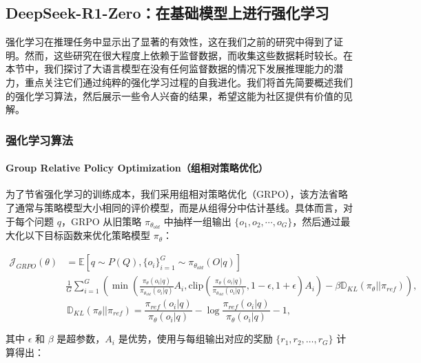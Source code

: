 \documentclass[lang=cn,a4paper,newtx]{elegantpaper}
\newcommand{\dsro}{DeepSeek-R1-Zero}
\begin{document}
\subsection{\dsro{}：在基础模型上进行强化学习}

强化学习在推理任务中显示出了显著的有效性，这在我们之前的研究中得到了证明。然而，这些研究在很大程度上依赖于监督数据，而收集这些数据耗时较长。在本节中，我们探讨了大语言模型在没有任何监督数据的情况下发展推理能力的潜力，重点关注它们通过纯粹的强化学习过程的自我进化。我们将首先简要概述我们的强化学习算法，然后展示一些令人兴奋的结果，希望这能为社区提供有价值的见解。

\subsubsection{强化学习算法}

\paragraph{Group Relative Policy Optimization（组相对策略优化）} 为了节省强化学习的训练成本，我们采用组相对策略优化（GRPO），该方法省略了通常与策略模型大小相同的评价模型，而是从组得分中估计基线。具体而言，对于每个问题 $q$，GRPO 从旧策略 $\pi_{\theta_{old}}$ 中抽样一组输出 $\{o_1, o_2, \cdots, o_G\}$，然后通过最大化以下目标函数来优化策略模型 $\pi_{\theta}$：

\begin{equation}
  \begin{split}
      \mathcal{J}_{GRPO}(\theta) &= \mathbb{E}{[q \sim P(Q), \{o_i\}_{i=1}^G \sim \pi_{\theta_{old}}(O|q)]}  \\
      & \frac{1}{G}\sum_{i=1}^G \left( \min \left( \frac{\pi_\theta(o_i |q)}{\pi_{\theta_{old}}(o_i |q)} A_i, \text{clip} \left( \frac{\pi_\theta(o_i |q)}{\pi_{\theta_{old}}(o_i |q)}, 1 - \epsilon, 1 + \epsilon \right)  A_i \right) - \beta \mathbb{D}_{KL}\left(\pi_{\theta} || \pi_{ref}\right)\right) ,
  \end{split}
  \label{eq:GRPO-obj}
\end{equation}
\begin{equation}
  \mathbb{D}_{KL}\left(\pi_{\theta} || \pi_{ref}\right) = \frac{\pi_{ref}(o_i|q)}{\pi_{\theta}(o_i|q)}- \log\frac{\pi_{ref}(o_i|q)}{\pi_{\theta}(o_i|q)} - 1,
\end{equation}

其中 $\epsilon$ 和 $\beta$ 是超参数，$A_i$ 是优势，使用与每组输出对应的奖励 $\{r_1, r_2, \ldots, r_G\}$ 计算得出：
\end{document}
